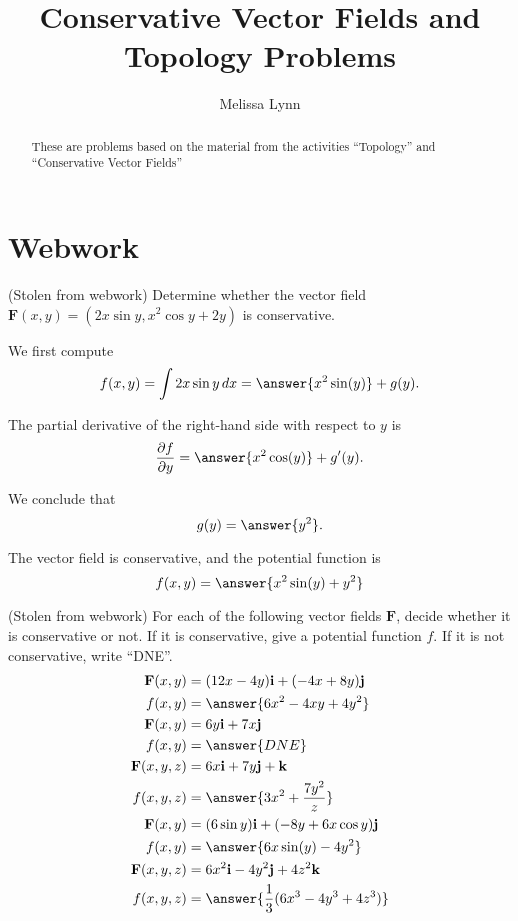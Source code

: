 \documentclass{ximera}
\title{Conservative Vector Fields and Topology Problems}
\author{Melissa Lynn}
\begin{document}
  
\begin{abstract}  
These are problems based on the material from the activities ``Topology'' and ``Conservative Vector Fields''
\end{abstract}  
\maketitle

\section{Webwork}

\begin{problem}
(Stolen from webwork) Determine whether the vector field $\mathbf{F}(x,y) = (2x\sin y,x^2\cos y + 2y)$ is conservative.

We first compute 
\[
f(x,y)=\int 2x\sin y\, dx = \answer{x^2\sin(y)}+g(y).
\]
\begin{problem}
The partial derivative of the right-hand side with respect to $y$ is
\[
\frac{\partial f}{\partial y} = \answer{x^2\cos(y)}+g'(y).
\]
\begin{problem}
We conclude that
\[
g(y) = \answer{y^2}.
\]
\begin{problem}
The vector field is conservative, and the potential function is
\[
f(x,y) = \answer{x^2\sin(y)+y^2}
\]
\end{problem}
\end{problem}
\end{problem}
\end{problem}

\begin{problem}
(Stolen from webwork) For each of the following vector fields $\mathbf{F}$, decide whether it is conservative or not. If it is conservative, give a potential function $f$. If it is not conservative, write ``DNE''.
\begin{align}
\mathbf{F}(x,y) &= (12x-4y)\mathbf{i} + (-4x+8y)\mathbf{j}\\
f(x,y) &=  \answer{6x^2-4xy+4y^2}\\
\mathbf{F}(x,y) &= 6y\mathbf{i} + 7x\mathbf{j}\\
f(x,y) &= \answer{DNE}\\
\mathbf{F}(x,y,z) &= 6x\mathbf{i} + 7y\mathbf{j} + \mathbf{k}\\
f(x,y,z) &= \answer{3x^2+\frac{7y^2}{z}}\\
\mathbf{F}(x,y) &=(6\sin y)\mathbf{i} + (-8y+6x\cos y)\mathbf{j}\\
f(x,y) &= \answer{6x\sin(y)-4y^2}\\
\mathbf{F}(x,y,z) &= 6x^2\mathbf{i}-4y^2\mathbf{j}+4z^2\mathbf{k}\\
f(x,y,z) &= \answer{\frac{1}{3}(6x^3-4y^3+4z^3)}
\end{align}
\end{problem}
\end{document}
